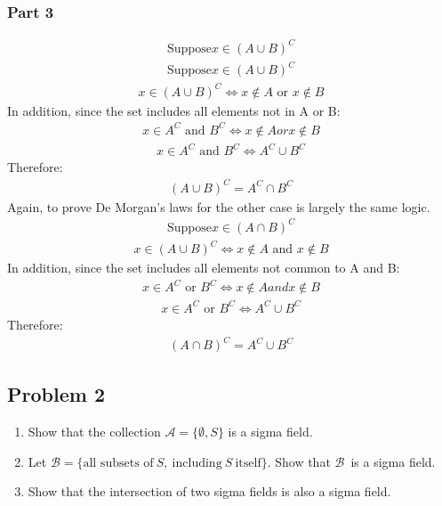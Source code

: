 \documentclass{article}
\begin{document}
\subsubsection*{Part 3}
\begin{align*}
\text{Suppose} x \in (A\cup B)^{C}
\end{align*}
\begin{align*}
\text{Suppose} x \in (A\cup B)^{C}
\end{align*}
\begin{align*}
x \in (A\cup B)^{C} \Leftrightarrow x \notin A \text{ or } x \notin B
\end{align*}
In addition, since the set includes all elements not in A or B:
\begin{align*}
x \in A^{C} \text{ and } B^{C} \Leftrightarrow x \notin A or x \notin B
\end{align*}
\begin{align*}
x \in A^{C} \text{ and } B^{C} \Leftrightarrow A^{C}\cup B^{C}
\end{align*}
Therefore:
\begin{align*}
\boxed{(A\cup B)^C = A^C \cap B^C}
\end{align*}
Again, to prove De Morgan's laws for the other case is largely the same logic.
\begin{align*}
\text{Suppose} x \in (A\cap B)^{C}
\end{align*}
\begin{align*}
x \in (A\cup B)^{C} \Leftrightarrow x \notin A \text{ and } x \notin B
\end{align*}
In addition, since the set includes all elements not common to A and B:
\begin{align*}
x \in A^{C} \text{ or } B^{C} \Leftrightarrow x \notin A and x \notin B
\end{align*}
\begin{align*}
x \in A^{C} \text{ or } B^{C} \Leftrightarrow A^{C}\cup B^{C}
\end{align*}
Therefore:
\begin{align*}
\boxed{(A\cap B)^C = A^C \cup B^C}
\end{align*}
\clearpage
\subsection*{Problem 2}
\begin{enumerate}
    \item
      Show that the collection $\mathcal{A} = \{\emptyset,S\}$ is a sigma field.
    \item
      Let $\mathcal{B} = \{\textrm{all subsets of}\ S,\  \textrm{including}\ S\  \textrm{itself}\}$. Show that  $\mathcal{B}$\ is a sigma field.
    \item
      Show that the intersection of two sigma fields is also a sigma field.
    \end{enumerate}
\end{document}
